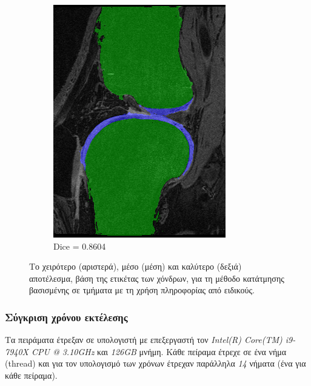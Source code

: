 \documentclass[a4paper,12pt]{article}
\begin{document}
\begin{figure}[H]
\begin{subfigure}[b]{0.32\linewidth}
    \includegraphics[width=\linewidth]{final_SPEP_best.png}
    \caption{Dice = 0.8604}
    \end{subfigure}

    \caption{Το χειρότερο (αριστερά), μέσο (μέση) και καλύτερο (δεξιά)
             αποτέλεσμα, βάση της ετικέτας των χόνδρων, για τη μέθοδο κατάτμησης
             βασισμένης σε τμήματα με τη χρήση πληροφορίας από ειδικούς.}
    \label{fig:final_dice_SPEP}
\end{figure}

\subsubsection{Σύγκριση χρόνου εκτέλεσης}

Τα πειράματα έτρεξαν σε υπολογιστή με επεξεργαστή τον \emph{Intel(R) Core(TM)
i9-7940X CPU @ 3.10GHz} και \emph{126GB} μνήμη. Κάθε πείραμα έτρεχε σε ένα νήμα
(thread) και για τον υπολογισμό των χρόνων έτρεχαν παράλληλα \emph{14} νήματα
(ένα για κάθε πείραμα).
\end{document}
